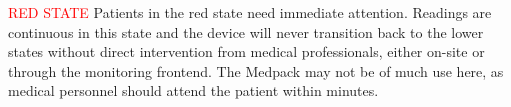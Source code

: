 \textcolor{red}{RED STATE} Patients in the red state need immediate attention. Readings are continuous in this state and the device will never transition back to the lower states without direct intervention from medical professionals, either on-site or through the monitoring frontend. The Medpack may not be of much use here, as medical personnel should attend the patient within minutes.


